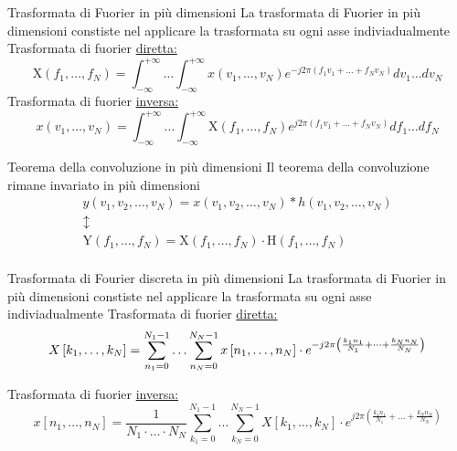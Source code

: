 \begin{definizione}{Trasformata di Fuorier in più dimensioni}
	La trasformata di Fuorier in più dimensioni constiste nel applicare la trasformata su ogni asse indiviadualmente
	\vskip3mm
	Trasformata di fuorier \underline{diretta:}
	\[
		\mathrm{X}\left(f_1, \ldots, f_N\right)=\int_{-\infty}^{+\infty} \ldots \int_{-\infty}^{+\infty} x\left(v_1, \ldots, v_N\right) e^{-j 2 \pi\left(f_1 v_1+\ldots+f_N v_N\right)} d v_1 \ldots d v_N
	\]
	Trasformata di fuorier \underline{inversa:}
	\[
		x\left(v_1, \ldots, v_N\right)=\int_{-\infty}^{+\infty} \ldots \int_{-\infty}^{+\infty} \mathrm{X}\left(f_1, \ldots, f_N\right) e^{j 2 \pi\left(f_1 v_1+\ldots+f_N v_N\right)} d f_1 \ldots d f_N
	\]
\end{definizione}
\begin{definizione}{Teorema della convoluzione in più dimensioni}
	Il teorema della convoluzione rimane invariato in più dimensioni
	\begin{gather*}
		y\left(v_1, v_2, \ldots, v_N\right)=x\left(v_1, v_2, \ldots, v_N\right) * h\left(v_1, v_2, \ldots, v_N\right) \\
		\updownarrow\\
		\mathrm{Y}\left(f_1, \ldots, f_N\right)=\mathrm{X}\left(f_1, \ldots, f_N\right) \cdot \mathrm{H}\left(f_1, \ldots, f_N\right) \\
	\end{gather*}
\end{definizione}

\begin{definizione}{Trasformata di Fourier discreta in più dimensioni}
	La trasformata di Fuorier in più dimensioni constiste nel applicare la trasformata su ogni asse indiviadualmente
	\vskip3mm
	Trasformata di fuorier \underline{diretta:}
	\[
		X\left[k_1, \ldots, k_N\right]=\sum_{n_1=0}^{N_1-1} \ldots \sum_{n_N=0}^{N_N-1} x\left[n_1, \ldots, n_N\right] \cdot e^{-j 2 \pi\left(\frac{k_1 n_1}{N_1}+\cdots+\frac{k_N n_N}{N_N}\right)}                                     \\
	\]

	Trasformata di fuorier \underline{inversa:}
	\[
		x\left[n_1, \ldots, n_N\right]=\frac{1}{N_1 \cdot \ldots \cdot N_N} \sum_{k_1=0}^{N_1-1} \ldots \sum_{k_N=0}^{N_N-1} X\left[k_1, \ldots, k_N\right] \cdot e^{j 2 \pi\left(\frac{k_1 n_1}{N_1}+\ldots+\frac{k_N n_N}{N_N}\right)}
	\]
\end{definizione}

\newpage





